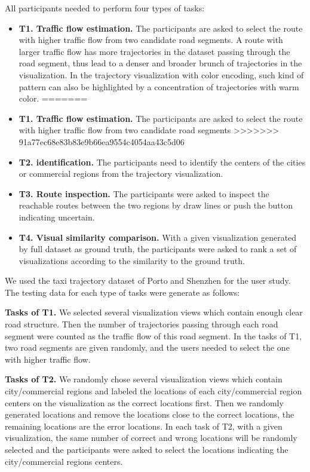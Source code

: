 All participants needed to perform four types of tasks:
\begin{itemize}[noitemsep]
<<<<<<< HEAD
	\item \textbf{T1. Traffic flow estimation.} 
	The participants are asked to select the route with higher traffic flow from two candidate road segments.
	A route with larger traffic flow has more trajectories in the dataset passing through the road segment, thus lead to a denser and broader brunch of trajectories in the visualization.  In the trajectory visualization with color encoding, such kind of pattern can also be highlighted by a concentration of trajectories with warm color.
=======
	\item \textbf{T1. Traffic flow estimation.}
	The participants are asked to select the route with higher traffic flow from two candidate road segments
>>>>>>> 91a77ec68e83b83e9b66ea9554c4054aa43c5d06
	\item \textbf{T2.  identification.} The participants need to identify the centers of the cities or commercial regions from the trajectory visualization.
	\item \textbf{T3. Route inspection.} The participants were asked to inspect the reachable routes between the two regions by draw lines or push the button indicating uncertain.
	\item \textbf{T4. Visual similarity comparison.} With a given visualization generated by full dataset as ground truth, the participants were asked to rank a set of visualizations according to the similarity to the ground truth.
\end{itemize}

We used the taxi trajectory dataset of Porto and Shenzhen for the user study. The testing data for each type of tasks were generate as follows:

\textbf{Tasks of T1.} We selected several visualization views which contain enough clear road structure. Then the number of trajectories passing through each road segment were counted as the traffic flow of this road segment. In the tasks of T1, two road segments are given randomly, and the users needed to select the one with higher traffic flow.

\textbf{Tasks of T2.} We randomly chose several visualization views which contain city/commercial regions and labeled the locations of each city/commercial region centers on the visualization as the correct locations first.  Then we randomly generated locations and remove the locations close to the correct locations, the remaining locations are the error locations. In each task of T2, with a given visualization, the same number of correct and wrong locations will be randomly selected and the participants were asked to select the locations indicating the city/commercial regions centers.

